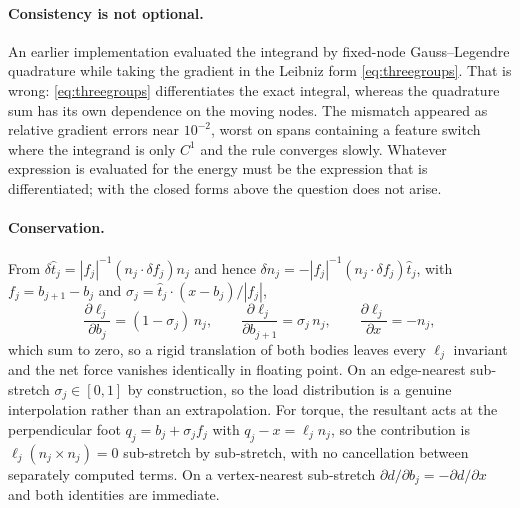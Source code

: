 \documentclass[11pt]{article}
\begin{document}
\paragraph{Consistency is not optional.} An earlier implementation evaluated the integrand by fixed-node Gauss--Legendre quadrature while taking the gradient in the Leibniz form \eqref{eq:threegroups}. That is wrong: \eqref{eq:threegroups} differentiates the exact integral, whereas the quadrature sum has its own dependence on the moving nodes. The mismatch appeared as relative gradient errors near $10^{-2}$, worst on spans containing a feature switch where the integrand is only $C^1$ and the rule converges slowly. Whatever expression is evaluated for the energy must be the expression that is differentiated; with the closed forms above the question does not arise.

\paragraph{Conservation.} From $\delta\hat t_j = |f_j|^{-1}(n_j\cdot\delta f_j)n_j$ and hence $\delta n_j = -|f_j|^{-1}(n_j\cdot\delta f_j)\hat t_j$, with $f_j = b_{j+1}-b_j$ and $\sigma_j = \hat t_j\cdot(x-b_j)/|f_j|$,
\begin{equation}
\frac{\partial\ell_j}{\partial b_j} = (1-\sigma_j)\,n_j, \qquad
\frac{\partial\ell_j}{\partial b_{j+1}} = \sigma_j\,n_j, \qquad
\frac{\partial\ell_j}{\partial x} = -n_j,
\label{eq:lever}
\end{equation}
which sum to zero, so a rigid translation of both bodies leaves every $\ell_j$ invariant and the net force vanishes identically in floating point. On an edge-nearest sub-stretch $\sigma_j\in[0,1]$ by construction, so the load distribution is a genuine interpolation rather than an extrapolation. For torque, the resultant acts at the perpendicular foot $q_j = b_j + \sigma_j f_j$ with $q_j - x = \ell_j n_j$, so the contribution is $\ell_j(n_j\times n_j) = 0$ sub-stretch by sub-stretch, with no cancellation between separately computed terms. On a vertex-nearest sub-stretch $\partial d/\partial b_j = -\partial d/\partial x$ and both identities are immediate.
\end{document}
